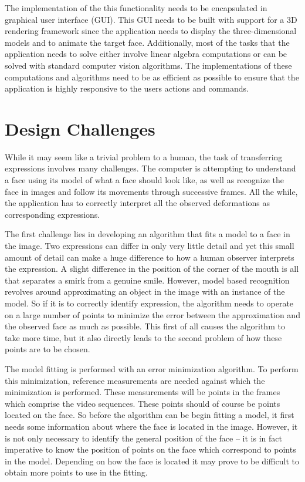 \documentclass[11pt,a4paper]{report}
\begin{document}
The implementation of the this functionality needs to be encapsulated in
graphical user interface (GUI). This GUI needs to be built with support for a 3D
rendering framework since the application needs to display the three-dimensional models and to animate
the target face. Additionally, most of the tasks that the application needs to
solve either involve linear algebra computations or can be solved with standard
computer vision algorithms. The implementations of these computations and
algorithms need to be as efficient as possible to ensure that the application is
highly responsive to the users actions and commands.

\section{Design Challenges}
While it may seem like a trivial problem to a human, the task of transferring expressions involves many
challenges. The computer is attempting to understand a face using its model of
what a face should look like, as well as recognize the face in images and follow
its movements through successive frames. All the while, the application has to 
correctly interpret all the observed deformations as corresponding expressions.  

The first challenge lies in developing an algorithm that fits a model to a face in
the image. Two expressions can differ in only very little detail and yet this
small amount of detail can make a huge difference to how a human observer
interprets the expression. A slight difference in the position of the corner of
the mouth is all that separates a smirk from a genuine smile. However, model based
recognition revolves around approximating an object in the image with an
instance of the model. So if it is to correctly identify expression, the
algorithm needs to operate on a large
number of points to minimize the error between the approximation and the
observed face as much as possible. This first of all causes the algorithm to take
more time, but it also directly leads to the second problem of how these points
are to be chosen. 

The model fitting is performed with an error minimization algorithm. To perform
this minimization, reference measurements are needed against which the minimization is
performed. These measurements will be points in the frames which comprise the
video sequences. These points should of course be points located on the
face. So before the algorithm can be begin fitting a model, it first needs some
information about where the face is located in the image. However, it is not
only necessary to identify the general position of the face -- it is in fact
imperative to know the position of points on the face which correspond to points in the
model. Depending on how the face is located it may prove to be difficult to
obtain more points to use in the fitting.
\end{document}
